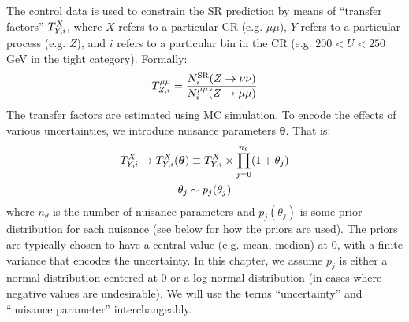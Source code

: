 The control data is used to constrain the SR prediction by means of ``transfer factors'' ${T}^{X}_{Y,i}$, where $X$ refers to a particular CR (e.g. $\mu\mu$), $Y$ refers to a particular process (e.g. $Z$), and $i$ refers to a particular bin in the CR (e.g. $200<U<250$ GeV in the tight category).
Formally:
\begin{equation}
    {T}^{\mu\mu}_{Z,i} = \frac{N^\mathrm{SR}_i(Z\rightarrow\nu\nu)}{N^{\mu\mu}_i(Z\rightarrow\mu\mu)}
\end{equation}
The transfer factors are estimated using MC simulation.
To encode the effects of various uncertainties, we introduce nuisance parameters $\bm{\theta}$.
That is:
\begin{gather}
    {T}^{X}_{Y,i} \rightarrow {T}^{X}_{Y,i}(\bm\theta) \equiv {T}^{X}_{Y,i} \times \prod_{j=0}^{n_\theta} (1+\theta_j) \\
    \theta_j \sim p_j(\theta_j)
\end{gather}
where $n_\theta$ is the number of nuisance parameters and $p_j(\theta_j)$ is some prior distribution for each nuisance (see below for how the priors are used).
The priors are typically chosen to have a central value (e.g. mean, median) at $0$, with a finite variance that encodes the uncertainty.
In this chapter, we assume $p_j$ is either a normal distribution centered at 0 or a log-normal distribution (in cases where negative values are undesirable).
We will use the terms ``uncertainty'' and ``nuisance parameter'' interchangeably.

